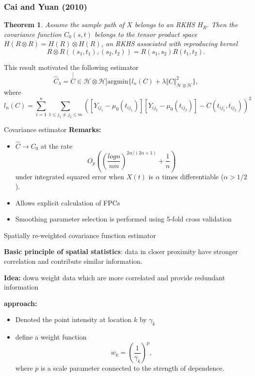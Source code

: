 \documentclass{beamer}
\newtheorem{thm}{Theorem}
\renewcommand{\H}{\mathcal{H}}
\begin{document}
\begin{frame}\frametitle{Cai and Yuan (2010)}
	\begin{thm}
Assume the sample path of $X$ belongs to an RKHS $H_{R}.$ Then the covariance function $C_{0}(s,t)$ belongs to the tensor product space $H(R\otimes R)=H(R)\otimes H(R)$,
an RKHS associated with reproducing kernel
\[
R\otimes R((s_{1},t_{1}),(s_{2},t_{2}))=R(s_{1},s_{2})R(t_{1},t_{2}).
\]
\end{thm}
This result motivated the following estimator
\begin{equation*}
\hat{C}_{\lambda}=\stackrel[C \in \H\otimes\H]{}{\mbox{argmin}} \{l_{n}(C)+\lambda\left\Vert C\right\Vert _{\H\otimes \H}^{2}\},
\end{equation*}
 where
\begin{equation*}
l_{n}(C)=\sum_{i=1}^{n}\sum_{1\leq j_{1}\neq j_{2}\leq m}([Y_{ij_{1}}-\mu_{0}(t_{ij_1})][Y_{ij_{2}}-\mu_{0}(t_{ij_{2}})]-C(t_{ij_{1}},t_{ij_{2}}))^{2}
\end{equation*}
\end{frame}

\begin{frame}[t]{Covariance estimator}
	\textbf{Remarks:}
	\begin{itemize}
		\item $\hat{C} \rightarrow C_0$ at the rate
		\[
			O_p\left(\left(\frac{log n}{nm}\right)^{2\alpha/(2\alpha + 1)} + \frac{1}{n}\right)
		\]
		under integrated squared error when $X(t)$ is $\alpha$ times differentiable ($\alpha > 1/2$).
		\item Allows explicit calculation of FPCs
		\item Smoothing parameter selection is performed using 5-fold cross validation
	\end{itemize}
\end{frame}

\begin{frame}[t]{Spatially re-weighted covariance function estimator}

	\textbf{Basic principle of spatial statistics}: data in closer proximity have stronger correlation and contribute similar information.

	\textbf{Idea:} down weight data which are more correlated and provide redundant information

	\textbf{approach:}
	\begin{itemize}
		\item Denoted the point intensity at location $k$ by $\gamma_k$
		\item define a weight function
	\begin{equation*}
		w_k = \left(\frac{1}{\gamma_k}\right)^p,
	\end{equation*}
	where $p$ is a scale parameter connected to the strength of dependence.
	\end{itemize}


\end{frame}
\end{document}

